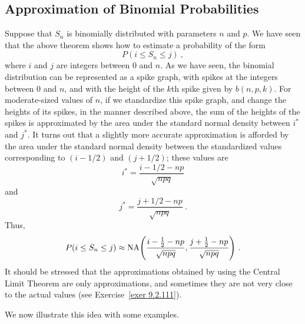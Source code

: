 \subsection*{Approximation of Binomial Probabilities}

Suppose that $S_n$ is binomially distributed with parameters $n$ and $p$.  We have seen that the
above theorem shows how to estimate a probability of the form 
\begin{equation}
P(i \le S_n \le j)\ ,
\label{eq 9.2}
\end{equation}
where $i$ and $j$ are integers between 0 and $n$.  As we have seen, the binomial distribution can be
represented as a spike graph, with spikes at the integers between 0 and $n$, and with
the height of the $k$th spike given by $b(n, p, k)$.  For moderate-sized values of $n$, if we
standardize this spike graph, and change the heights of its spikes, in the manner
described above, the sum of the heights of the spikes is approximated by the area under the
standard normal density between $i^*$ and $j^*$.  It turns out that a slightly more accurate
approximation is afforded by the area under the standard normal density between the standardized
values corresponding to $(i - 1/2)$ and $(j + 1/2)$; these values are
$$i^* = \frac{i - 1/2 - np}{\sqrt {npq}}$$
and
$$j^* = \frac{j + 1/2 - np}{\sqrt {npq}}\ .$$
Thus,
$$P(i \le S_n \le j) \approx {\rm NA}\Biggl({{i - {1\over 2} - np}\over{\sqrt {npq}}} ,
{{j + {1\over 2} - np}\over{\sqrt {npq}}}\Biggr)\ .$$
It should be stressed that the approximations obtained by using the Central Limit Theorem are only
approximations, and sometimes they are not very close to the actual values (see Exercise~\ref{exer 9.2.111}). 
\par
We now illustrate this idea with some examples.

